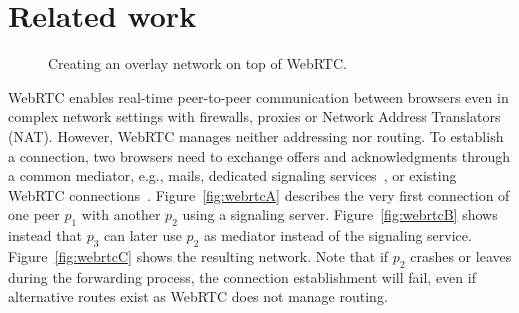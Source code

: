 
\section{Related work}
\label{sec:relatedwork}

\begin{figure*}
\centering
{}
\hspace{5pt}
\hspace{5pt}
\caption{\label{fig:webrtc}Creating an overlay network on top of WebRTC.}
\end{figure*}

WebRTC enables real-time peer-to-peer communication between browsers
even in complex network settings with firewalls, proxies or Network
Address Translators (NAT). However, WebRTC manages neither addressing
nor routing. To establish a connection, two browsers need to exchange
offers and acknowledgments through a common mediator, e.g., mails,
dedicated signaling services~\cite{peerjs}, or existing WebRTC
connections~\cite{p}. Figure~\ref{fig:webrtcA} describes the very
first connection of one peer $p_1$ with another $p_2$ using a
signaling server. Figure~\ref{fig:webrtcB} shows instead that $p_3$
can later use $p_2$ as mediator instead of the signaling
service. Figure~\ref{fig:webrtcC} shows the resulting network. Note
that if $p_2$ crashes or leaves during the forwarding
process, the connection establishment will fail, even if
alternative routes exist as WebRTC does not manage routing.

